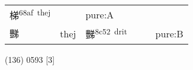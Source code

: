 \documentclass[14pt,a4paper]{scrartcl}
\begin{document}
\begin{longtable}[c]{@{}llllll@{}}
\begin{minipage}[t]{0.14\columnwidth}
梯\textsuperscript{68af~thej}
\strut\end{minipage} &
\begin{minipage}[t]{0.14\columnwidth}\raggedright\strut
\strut\end{minipage} &
\begin{minipage}[t]{0.14\columnwidth}\raggedright\strut
pure:A
\strut\end{minipage}\tabularnewline
\begin{minipage}[t]{0.14\columnwidth}\raggedright\strut
豒
\strut\end{minipage} &
\begin{minipage}[t]{0.14\columnwidth}\raggedright\strut
thej
\strut\end{minipage} &
\begin{minipage}[t]{0.14\columnwidth}\raggedright\strut
豒\textsuperscript{8c52~drit}
\strut\end{minipage} &
\begin{minipage}[t]{0.14\columnwidth}\raggedright\strut
\strut\end{minipage} &
\begin{minipage}[t]{0.14\columnwidth}\raggedright\strut
\strut\end{minipage} &
\begin{minipage}[t]{0.14\columnwidth}\raggedright\strut
pure:B
\strut\end{minipage}\tabularnewline
\bottomrule
\end{longtable}

(136) 0593 {[}3{]}
\end{document}
